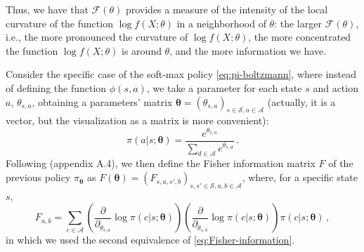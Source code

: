 Thus, we have that $\mathcal F(\theta)$ provides a measure of the intensity of the local curvature of the function $\log f(X; \theta)$ in a neighborhood of $\theta$: the larger $\mathcal F(\theta)$, i.e., the more pronounced the curvature of $\log f(X; \theta)$, the more concentrated the function $\log f(X; \theta)$ is around $\theta$, and the more information we have.

Consider the specific case of the soft-max policy \eqref{eq:pi-boltzmann}, where instead of defining the function $\phi(s,a)$, we take a parameter for each state $s$ and action $a$, $\theta_{s,a}$, obtaining a parameters' matrix $\boldsymbol \theta = (\theta_{s,a})_{s \in \mathcal S, a \in \mathcal A}$ (actually, it is a vector, but the visualization as a matrix is more convenient):
\begin{equation}
    \pi(a|s; \boldsymbol \theta) = \frac{e^{\theta_{s,a}}}{\sum_{d \in \mathcal A} e^{\theta_{s,d}}} \, .
\end{equation}
Following \cite{Hennes2020} (appendix A.4), we then define the Fisher information matrix $F$ of the previous policy $\pi_{\boldsymbol \theta}$ as $F(\boldsymbol \theta) = (F_{s,a,s',b})_{s,s' \in \mathcal S, a,b \in \mathcal A}$, where, for a specific state $s$,
\begin{equation}
    F_{a,b} = \sum_{c \in \mathcal A} \left( \frac{\partial}{\partial_{\theta_{s,a}}} \log \pi(c|s; \boldsymbol \theta) \right) \left( \frac{\partial}{\partial_{\theta_{s,b}}} \log \pi(c|s; \boldsymbol \theta) \right) \pi(c|s; \boldsymbol \theta) \, ,
    \label{eq:Fisher-matrix}
\end{equation}
in which we used the second equivalence of \eqref{eq:Fisher-information}.

